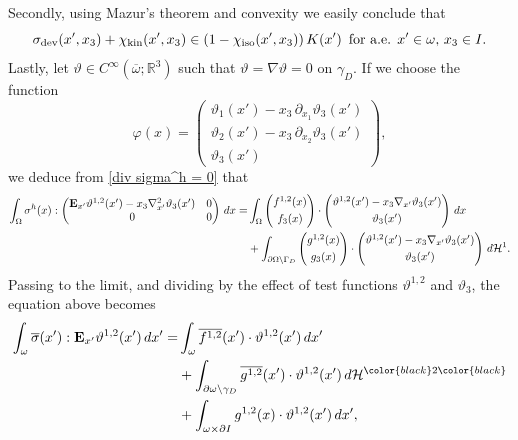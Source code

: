 \documentclass[reqno,10pt]{amsart}
\numberwithin{equation}{section}
\theoremstyle{remark}
\newcommand{\RED}{\color{black}}
\newcommand{\BLACK}{\color{black}}
\newcommand{\calH}{\mathcal{H}}
\newcommand{\R}{\mathbb{R}}
\DeclareMathOperator{\dev}{dev}
\newcommand{\closure}[1]{\overline{#1}}
\newcommand{\fvol}{f}
\newcommand{\fsurf}{g}
\newcommand{\Dir}{D}
\newcommand{\zerothI}[1]{\overline{#1}}
\newcommand{\E}{{\bf E}}
\newcommand{\D}{\nabla}
\newcommand{\chikin}{\chi_{\rm kin}}
\newcommand{\chiiso}{\chi_{\rm iso}}
\begin{document}
Secondly, using Mazur's theorem and convexity we easily conclude that 
\begin{equation}
	\sigma_{\dev}(x',x_3)+\chikin(x',x_3) \in \left(1-\chiiso(x',x_3)\right) K(x') \,\text{ for a.e. } x' \in \omega,\, x_3 \in I. 
\end{equation} 
Lastly, let $\vartheta \in C^{\infty}(\closure{\omega};\R^3)$ such that $\vartheta=\nabla \vartheta=0$ on $\gamma_D$.
If we choose the function
\begin{equation*}
	\varphi(x) = \left(\begin{array}{c} \vartheta_1(x') - x_3\,\partial_{x_1}\vartheta_3(x') \\ \vartheta_2(x') - x_3\,\partial_{x_2}\vartheta_3(x') \\ \vartheta_3(x') \end{array}\right),
\end{equation*}
we deduce from \eqref{div sigma^h = 0} that
\begin{equation*}
\begin{split}
	\int_{\Omega} \sigma^h(x) : \begin{pmatrix} {\E}_{x'}\vartheta^{1,2}(x') - x_3 {\D}^2_{x'}\vartheta_3(x') & 0 \\ 0 & 0 \end{pmatrix} \,dx 
	=& \int_{\Omega} 
	\begin{pmatrix}
		\fvol^{1,2}(x) \\[3pt]
		\fvol_{3}(x)
	\end{pmatrix}
	\cdot 
	\begin{pmatrix}
		\vartheta^{1,2}(x') - x_3 \nabla_{x'}\vartheta_3(x') \\[3pt]
		\vartheta_3(x')
	\end{pmatrix}
	\,dx 
	\\& + \int_{\partial{\Omega} \setminus \Gamma_\Dir} \begin{pmatrix}
		\fsurf^{1,2}(x) \\[3pt]
		\fsurf_{3}(x)
	\end{pmatrix}
	\cdot 
	\begin{pmatrix}
		\vartheta^{1,2}(x') - x_3 \nabla_{x'}\vartheta_3(x') \\[3pt]
		\vartheta_3(x')
	\end{pmatrix} \,d\calH^{1}
	.
\end{split}
\end{equation*}
Passing to the limit,
and dividing by the effect of test functions $\vartheta^{1,2}$ and $\vartheta_3$, the equation above becomes
\begin{equation*}
\begin{split}
	\int_{\omega} \zerothI{\sigma}(x') : {\E}_{x'}\vartheta^{1,2}(x') \,dx' 
	=& \int_{\omega} \zerothI{\fvol^{1,2}}(x') \cdot \vartheta^{1,2}(x') \,dx' 
	\\& + \int_{\partial{\omega} \setminus \gamma_\Dir} \zerothI{\fsurf^{1,2}}(x') \cdot \vartheta^{1,2}(x') \,d\calH^{{\RED2\BLACK}}
	\\& + \int_{\omega \times \partial{I}} \fsurf^{1,2}(x) \cdot \vartheta^{1,2}(x') \,dx'
	,
\end{split}
\end{equation*}
\end{document}
